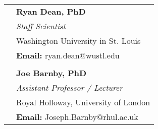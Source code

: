 \documentclass{article}
\begin{document}
\begin{longtable}{r | p{13cm}}
											& \large\textbf{Ryan Dean, PhD} \\
											& \textit{Staff Scientist} \\
											& Washington University in St. Louis \\
											& \textbf{Email:} ryan.dean@wustl.edu \\
											& \\

											& \large\textbf{Joe Barnby, PhD} \\
											& \textit{Assistant Professor / Lecturer} \\
											& Royal Holloway, University of London \\
											& \textbf{Email:} Joseph.Barnby@rhul.ac.uk \\
	\end{longtable}
\end{document}
